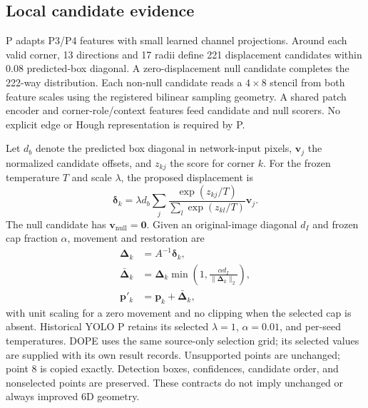 \documentclass[journal]{IEEEtran}
\begin{document}
\subsection{Local candidate evidence}
P adapts P3/P4 features with small learned channel projections. Around each valid corner, 13 directions and 17 radii define 221 displacement candidates within 0.08 predicted-box diagonal. A zero-displacement null candidate completes the 222-way distribution. Each non-null candidate reads a $4\times8$ stencil from both feature scales using the registered bilinear sampling geometry. A shared patch encoder and corner-role/context features feed candidate and null scorers. No explicit edge or Hough representation is required by P.

Let $d_b$ denote the predicted box diagonal in network-input pixels, $\mathbf{v}_j$ the normalized candidate offsets, and $z_{kj}$ the score for corner $k$. For the frozen temperature $T$ and scale $\lambda$, the proposed displacement is
\begin{equation}
\boldsymbol{\delta}_k=\lambda d_b\sum_j\frac{\exp(z_{kj}/T)}{\sum_l\exp(z_{kl}/T)}\mathbf{v}_j.
\end{equation}
The null candidate has $\mathbf{v}_{\mathrm{null}}=\mathbf{0}$. Given an original-image diagonal $d_I$ and frozen cap fraction $\alpha$, movement and restoration are
\begin{align}
\boldsymbol{\Delta}_k&=A^{-1}\boldsymbol{\delta}_k,\\
\bar{\boldsymbol{\Delta}}_k&=\boldsymbol{\Delta}_k\min\left(1,\frac{\alpha d_I}{\|\boldsymbol{\Delta}_k\|_2}\right),\\
\mathbf{p}'_k&=\mathbf{p}_k+\bar{\boldsymbol{\Delta}}_k,
\end{align}
with unit scaling for a zero movement and no clipping when the selected cap is absent. Historical YOLO P retains its selected $\lambda=1$, $\alpha=0.01$, and per-seed temperatures. DOPE uses the same source-only selection grid; its selected values are supplied with its own result records. Unsupported points are unchanged; point 8 is copied exactly. Detection boxes, confidences, candidate order, and nonselected points are preserved. These contracts do not imply unchanged or always improved 6D geometry.
\end{document}
